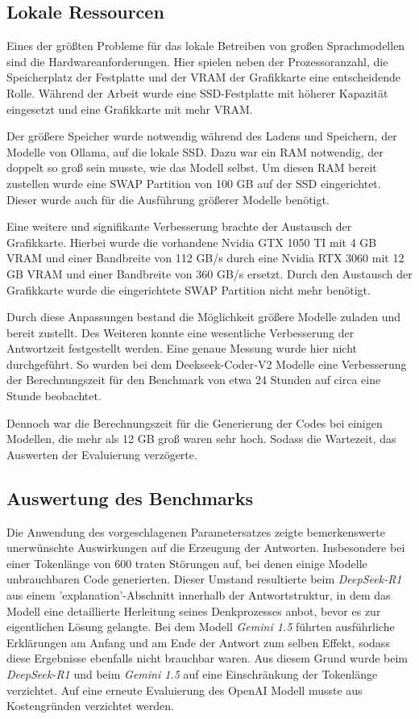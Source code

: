 \subsection{Lokale Ressourcen}
Eines der größten Probleme für das lokale Betreiben von großen Sprachmodellen sind die Hardwareanforderungen. Hier spielen neben der Prozessoranzahl, die Speicherplatz der Festplatte und der VRAM der Grafikkarte eine entscheidende Rolle. Während der Arbeit wurde eine SSD-Festplatte mit höherer Kapazität eingesetzt und eine Grafikkarte mit mehr VRAM.\vspace{0.2cm}

Der größere Speicher wurde notwendig während des Ladens und Speichern, der Modelle von Ollama, auf die lokale SSD. Dazu war ein RAM notwendig, der doppelt so groß sein musste, wie das Modell selbst. Um diesen RAM bereit zustellen wurde eine SWAP Partition von 100 GB auf der SSD eingerichtet. Dieser wurde auch für die Ausführung größerer Modelle benötigt.\vspace{0.2cm}

Eine weitere und signifikante Verbesserung brachte der Austausch der Grafikkarte. Hierbei wurde die vorhandene Nvidia GTX 1050 TI mit 4 GB \acrfull{VRAM} und einer Bandbreite von 112 GB/s durch eine Nvidia RTX 3060 mit 12 GB VRAM und einer Bandbreite von 360 GB/s ersetzt. Durch den Austausch der Grafikkarte wurde die eingerichtete SWAP Partition nicht mehr benötigt.

Durch diese Anpassungen bestand die Möglichkeit größere Modelle zuladen und bereit zustellt. Des Weiteren konnte eine wesentliche Verbesserung der Antwortzeit festgestellt werden. Eine genaue Messung wurde hier nicht durchgeführt. So wurden bei dem Deekseek-Coder-V2 Modelle eine Verbesserung der Berechnungszeit für den Benchmark von etwa 24 Stunden auf circa eine Stunde beobachtet.\vspace{0.2cm}

Dennoch war die Berechnungszeit für die Generierung der Codes bei einigen Modellen, die mehr als 12 GB groß waren sehr hoch. Sodass die Wartezeit, das Auswerten der Evaluierung verzögerte.


\subsection{Auswertung des Benchmarks}
Die Anwendung des vorgeschlagenen Parametersatzes zeigte bemerkenswerte unerwünschte Auswirkungen auf die Erzeugung der Antworten. Insbesondere bei einer Tokenlänge von 600 traten Störungen auf, bei denen einige Modelle unbrauchbaren Code generierten. Dieser Umstand resultierte beim \textit{DeepSeek-R1} aus einem 'explanation'-Abschnitt innerhalb der Antwortstruktur, in dem das Modell eine detaillierte Herleitung seines Denkprozesses anbot, bevor es zur eigentlichen Lösung gelangte. Bei dem Modell \textit{Gemini 1.5} führten ausführliche Erklärungen am Anfang und am Ende der Antwort zum selben Effekt, sodass diese Ergebnisse ebenfalls nicht brauchbar waren. Aus diesem Grund wurde beim \textit{DeepSeek-R1} und beim \textit{Gemini 1.5} auf eine Einschränkung der Tokenlänge verzichtet. Auf eine erneute Evaluierung des OpenAI Modell musste aus Kostengründen verzichtet werden.\vspace{0.2cm}

